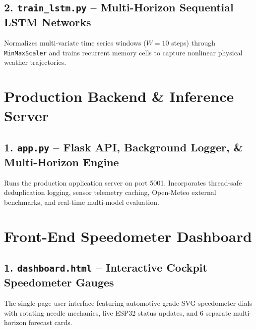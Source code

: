 \documentclass[11pt,a4paper]{article}
\begin{document}


\newpage
\subsection{2. \texttt{train\_lstm.py} -- Multi-Horizon Sequential LSTM Networks}
Normalizes multi-variate time series windows ($W = 10$ steps) through \texttt{MinMaxScaler} and trains recurrent memory cells to capture nonlinear physical weather trajectories.



\newpage
\section{Production Backend \& Inference Server}

\subsection{1. \texttt{app.py} -- Flask API, Background Logger, \& Multi-Horizon Engine}
Runs the production application server on port 5001. Incorporates thread-safe deduplication logging, sensor telemetry caching, Open-Meteo external benchmarks, and real-time multi-model evaluation.



\newpage
\section{Front-End Speedometer Dashboard}

\subsection{1. \texttt{dashboard.html} -- Interactive Cockpit Speedometer Gauges}
The single-page user interface featuring automotive-grade SVG speedometer dials with rotating needle mechanics, live ESP32 status updates, and 6 separate multi-horizon forecast cards.


\end{document}
